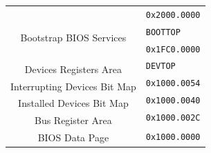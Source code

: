 \documentclass[12pt,a4paper,openright,twoside]{report}
\begin{document}
\begin{figure}[ht]
	\centering
	\begin{tabular}{cl}
		\multicolumn{1}{l}{}                                                & \multirow{2}{*}{\texttt{0x2000.0000}} \\ \hhline{-~}
		\multicolumn{1}{|l|}{\cellcolor{gray}}                              &                                       \\ [-3ex]
		\multicolumn{1}{|l|}{\cellcolor{gray}}                              & \multirow{2}{*}{\texttt{BOOTTOP}}     \\ \cline{1-1}
		\multicolumn{1}{|c|}{\multirow{2}{*}{Bootstrap BIOS Services}}      &                                       \\ [-1ex]
		\multicolumn{1}{|c|}{}                                              & \multirow{2}{*}{\texttt{0x1FC0.0000}} \\ \hhline{-~}
		\multicolumn{1}{|l|}{\multirow{2}{*}{\cellcolor{gray}}}             &                                       \\ [-3ex]
		\multicolumn{1}{|l|}{\cellcolor{gray}}                              & \multirow{2}{*}{\texttt{DEVTOP}}      \\ \cline{1-1}
		\multicolumn{1}{|c|}{\multirow{2}{*}{Devices Registers Area}}       &                                       \\ [-1ex]
		\multicolumn{1}{|c|}{}                                              & \multirow{2}{*}{\texttt{0x1000.0054}} \\ \cline{1-1}
		\multicolumn{1}{|c|}{\multirow{2}{*}{Interrupting Devices Bit Map}} &                                       \\ [-1ex]
		\multicolumn{1}{|c|}{}                                              & \multirow{2}{*}{\texttt{0x1000.0040}} \\ \cline{1-1}
		\multicolumn{1}{|c|}{\multirow{2}{*}{Installed Devices Bit Map}}    &                                       \\ [-1ex]
		\multicolumn{1}{|c|}{}                                              & \multirow{2}{*}{\texttt{0x1000.002C}} \\ \cline{1-1}
		\multicolumn{1}{|c|}{\multirow{2}{*}{Bus Register Area}}            &                                       \\ [-1ex]
		\multicolumn{1}{|c|}{}                                              & \multirow{2}{*}{\texttt{0x1000.0000}} \\ \cline{1-1}
		\multicolumn{1}{|c|}{\multirow{2}{*}{BIOS Data Page}}               &                                       \\ [-1ex]

\end{tabular}
\end{figure}
\end{document}
